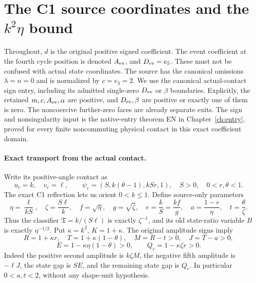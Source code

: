 \section{\texorpdfstring{The C1 source coordinates and the $k^2\eta$ bound}{The C1 source coordinates and the k2eta bound}}
\label{component:pa133fae35e52}


Throughout, $d$ is the original positive signed coefficient. The event
coefficient at the fourth cycle position is denoted $A_{\rm ev}$, and
$D_{\rm ev}=e_5$. These must not be confused with actual state coordinates.
The source has the canonical omissions $\lambda=n=0$ and is normalized
by $c=e_3=2$. We use the canonical actual-contact sign entry, including
its admitted single-zero $D_{\rm ev}$ or $\beta$ boundaries. Explicitly,
the retained $m,c,A_{\rm ev},\alpha$ are positive, and $D_{\rm ev},\beta$
are positive or exactly one of them is zero. The noncoercive further-zero
faces are already separate exits. The sign and nonsingularity input is the native-entry theorem EN in Chapter~\ref{ch:entry}, proved for every finite noncommuting physical contact in this exact coefficient domain.

\paragraph{Exact transport from the actual contact.}
Write its positive-angle contact as
\[
 u_c=k,\quad v_c=\ell,\qquad
 \psi_c=(S,k(\theta-1),kSr,1),\quad
 S>0,\quad 0<r,\theta<1.
\]
The exact C1 reflection lets us orient $0<k\le1$. Define source-only
parameters
\[
 \eta=\frac{\ell}{kS},\quad \zeta=\frac{S\ell}{k},\quad
 f=\sqrt\eta,\quad g=\sqrt\zeta,\quad
 e=\frac{k}{S}=\frac{kf}{g},\quad
 a=\frac{1-r}{\eta},\quad t=\frac\theta\zeta.
                                                               \tag{CE1}
\]
Thus the classifier $\mathfrak T=k/(S\ell)$ is exactly $\zeta^{-1}$,
and its old state-ratio variable $B$ is exactly $\eta^{-1/2}$.
Put $\kappa=k^2$, $K=1+\kappa$. The original amplitude signs imply
\[
 R=1+\kappa r,\quad T=1+\kappa(1-\theta),\quad
 M=R-t>0,\quad J=T-a>0,
\]
\[
 E=1-\kappa\eta(1-\theta)>0,\qquad
 Q_c=1-\kappa\zeta r>0.                              \tag{CE2}
\]
Indeed the positive second amplitude is $k\zeta M$, the negative
fifth amplitude is $-\ell J$, the state gap is $SE$, and the remaining
state gap is $Q_c$. In particular $0<a,t<2$, without any shape-unit
hypothesis.

